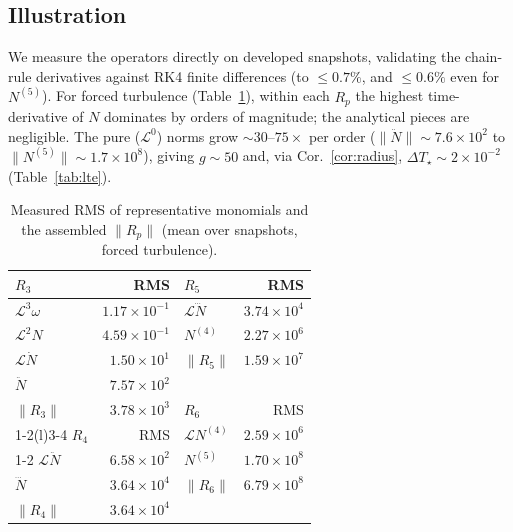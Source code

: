 \documentclass[11pt]{article}
\theoremstyle{plain}
\theoremstyle{definition}
\newcommand{\Lop}{\mathcal{L}}
\newcommand{\Ndot}{\dot{N}}
\newcommand{\Nddot}{\ddot{N}}
\newcommand{\Ndddot}{\dddot{N}}
\newcommand{\DT}{\Delta T}
\begin{document}
\subsection{Illustration}
\label{sec:closure-illus}
We measure the operators directly on developed snapshots, validating the
chain-rule derivatives against RK4 finite differences (to $\le0.7\%$, and
$\le0.6\%$ even for $N^{(5)}$). For forced turbulence
(Table~\ref{tab:mono}), within each $R_p$ the highest time-derivative of $N$
dominates by orders of magnitude; the analytical pieces are negligible. The
pure ($\Lop^0$) norms grow $\sim\!30$--$75\times$ per order
($\|\Nddot\|\!\sim\!7.6\!\times\!10^2$ to
$\|N^{(5)}\|\!\sim\!1.7\!\times\!10^8$), giving $g\!\sim\!50$ and, via
Cor.~\ref{cor:radius}, $\DT_\star\!\sim\!2\!\times\!10^{-2}$
(Table~\ref{tab:lte}).
\begin{table}[h]
\centering\small
\caption{Measured RMS of representative monomials and the assembled
$\|R_p\|$ (mean over snapshots, forced turbulence).}
\label{tab:mono}
\begin{tabular}{lr lr}
\toprule
$R_3$ & RMS & $R_5$ & RMS \\
\midrule
$\Lop^3\omega$ & $1.17\!\times\!10^{-1}$ & $\Lop\Ndddot$ & $3.74\!\times\!10^{4}$\\
$\Lop^2 N$     & $4.59\!\times\!10^{-1}$ & $N^{(4)}$     & $2.27\!\times\!10^{6}$\\
$\Lop\Ndot$    & $1.50\!\times\!10^{1}$  & $\|R_5\|$     & $1.59\!\times\!10^{7}$\\
$\Nddot$       & $7.57\!\times\!10^{2}$  &              & \\
$\|R_3\|$      & $3.78\!\times\!10^{3}$  & $R_6$ & RMS\\
\cmidrule(l){1-2}\cmidrule(l){3-4}
$R_4$ & RMS & $\Lop N^{(4)}$ & $2.59\!\times\!10^{6}$\\
\cmidrule(l){1-2}
$\Lop\Nddot$ & $6.58\!\times\!10^{2}$ & $N^{(5)}$ & $1.70\!\times\!10^{8}$\\
$\Ndddot$    & $3.64\!\times\!10^{4}$ & $\|R_6\|$ & $6.79\!\times\!10^{8}$\\
$\|R_4\|$    & $3.64\!\times\!10^{4}$ &           & \\
\bottomrule
\end{tabular}
\end{table}
\end{document}

